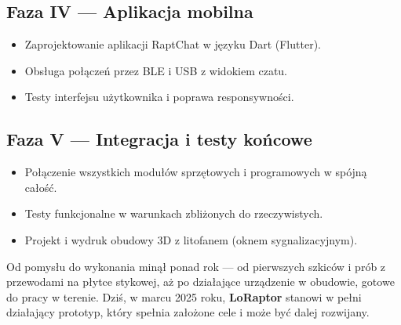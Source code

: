 \subsection*{Faza IV --- Aplikacja mobilna}

\begin{itemize}
	\item Zaprojektowanie aplikacji RaptChat w języku Dart (Flutter).
	\item Obsługa połączeń przez BLE i USB z widokiem czatu.
	\item Testy interfejsu użytkownika i poprawa responsywności.
\end{itemize}

\subsection*{Faza V --- Integracja i testy końcowe}

\begin{itemize}
	\item Połączenie wszystkich modułów sprzętowych i programowych w spójną całość.
	\item Testy funkcjonalne w warunkach zbliżonych do rzeczywistych.
	\item Projekt i wydruk obudowy 3D z litofanem (oknem sygnalizacyjnym).
\end{itemize}
\smallskip
Od pomysłu do wykonania minął ponad rok --- od pierwszych szkiców i prób z przewodami na płytce stykowej, aż po działające urządzenie w obudowie, gotowe do pracy w terenie. Dziś, w marcu 2025 roku, \textbf{LoRaptor} stanowi w pełni działający prototyp, który spełnia założone cele i może być dalej rozwijany.